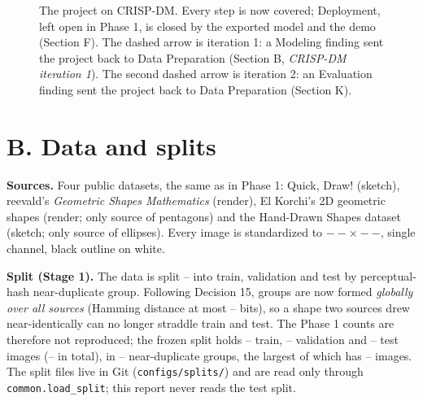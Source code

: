 \documentclass[11pt]{article}
\providecommand{\SplitTrain}{--}
\providecommand{\SplitVal}{--}
\providecommand{\SplitTest}{--}
\providecommand{\SplitTotal}{--}
\providecommand{\NearDupGroups}{--}
\providecommand{\LargestNearDupGroup}{--}
\providecommand{\PhashHammingMax}{--}
\providecommand{\SplitRatios}{--}
\providecommand{\ImageSize}{--}
\begin{document}
\begin{figure}[H]
{}
\caption{The project on CRISP-DM. Every step is now covered; Deployment, left
open in Phase 1, is closed by the exported model and the demo (Section F). The
dashed arrow is iteration 1: a Modeling finding sent the project back to Data
Preparation (Section B, \emph{CRISP-DM iteration 1}). The second dashed arrow
is iteration 2: an Evaluation finding sent the project back to Data Preparation
(Section K).}
\label{fig:crisp}
\end{figure}

\section*{B. Data and splits}

\textbf{Sources.} Four public datasets, the same as in Phase 1: Quick, Draw!
\cite{quickdraw} (sketch), reevald's \emph{Geometric Shapes Mathematics}
\cite{kagglereevald} (render), El Korchi's 2D geometric shapes
\cite{elkorchi} (render; only source of pentagons) and the Hand-Drawn Shapes
dataset \cite{handdrawn} (sketch; only source of ellipses). Every image is
standardized to $\ImageSize{\times}\ImageSize$, single channel, black outline on
white.

\textbf{Split (Stage 1).} The data is split \SplitRatios{} into train,
validation and test by perceptual-hash near-duplicate group. Following
Decision 15, groups are now formed \emph{globally over all sources}
(Hamming distance at most \PhashHammingMax{} bits), so a shape two sources
drew near-identically can no longer straddle train and test. The Phase 1
counts are therefore not reproduced; the frozen split holds \SplitTrain{}
train, \SplitVal{} validation and \SplitTest{} test images
(\SplitTotal{} in total), in \NearDupGroups{} near-duplicate groups, the
largest of which has \LargestNearDupGroup{} images. The split files live in
Git (\nolinkurl{configs/splits/}) and are read only through
\nolinkurl{common.load_split}; this report never reads the test split.
\end{document}
